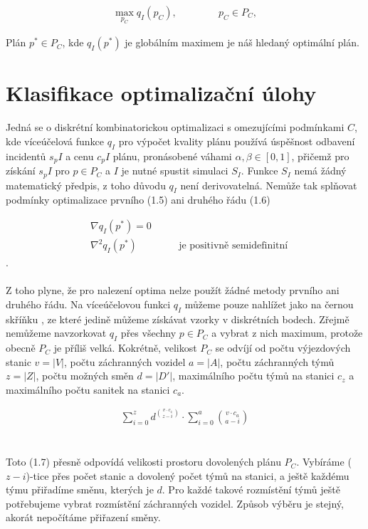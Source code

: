 \begin{definice}
  \begin{align}
    \max_{p_C} q_I(p_C), \hspace{50pt} p_C \in P_C,
  \end{align}
\end{definice}

Plán $p^* \in P_C$, kde $q_I(p^*)$ je globálním maximem je náš hledaný optimální plán.

\section{Klasifikace optimalizační úlohy}

Jedná se o diskrétní kombinatorickou optimalizaci s omezujícími podmínkami $C$, kde víceúčelová funkce $q_I$ pro výpočet kvality plánu používá úspěšnost
odbavení incidentů $s_pI$ a cenu $c_pI$ plánu, pronásobené váhami $\alpha, \beta \in [0, 1]$,
přičemž pro získání $s_pI$ pro $p \in P_C$ a $I$ je nutné spustit simulaci $S_I$.
Funkce $S_I$ nemá žádný matematický předpis, z toho důvodu $q_I$ není derivovatelná.
Nemůže tak splňovat podmínky optimalizace prvního (1.5) ani druhého řádu (1.6) %

\begin{align}
  &\nabla q_I(p^*) = 0 \\
  &\nabla^2 q_I(p^*) \hspace{50pt} \text{je positivně semidefinitní}
\end{align}
.
\\
\\
Z toho plyne, že pro nalezení optima nelze použít žádné metody prvního ani druhého řádu. %
Na víceúčelovou funkci $q_I$ můžeme pouze nahlížet jako na černou skříňku %
, ze které jedině můžeme získávat vzorky v diskrétních bodech.
Zřejmě nemůžeme navzorkovat $q_I$ přes všechny $p \in P_C$ a vybrat z nich maximum, protože obecně $P_C$ je příliš velká.
Kokrétně, velikost $P_C$ se odvíjí od počtu výjezdových stanic $v = |V|$, počtu záchranných vozidel $a = |A|$, počtu záchranných týmů $z = |Z|$, počtu možných směn $d = |D'|$, 
maximálního počtu týmů na stanici $c_z$ a maximálního počtu sanitek na stanici $c_a$.

\begin{align}
  \sum_{i=0}^{z}{d^{v \cdot c_z \choose z - i}} \cdot \sum_{i = 0}^{a}{v \cdot c_a \choose a - i}
\end{align}
\\
\\
Toto (1.7) %
přesně odpovídá velikosti prostoru dovolených plánu $P_C$. Vybíráme ($z-i$)-tice přes počet stanic a dovolený počet týmů na stanici, a ještě každému týmu
přiřadíme směnu, kterých je $d$. Pro každé takové rozmístění týmů ještě potřebujeme vybrat rozmístění záchranných vozidel.
Způsob výběru je stejný, akorát nepočítáme přiřazení směny.

